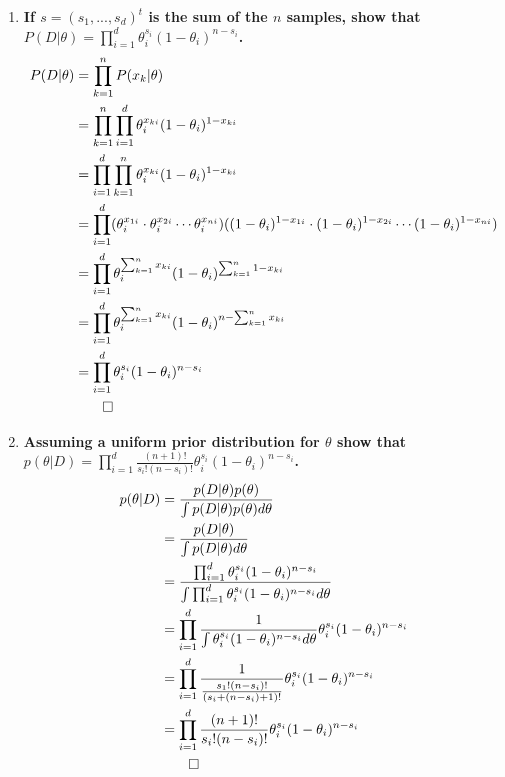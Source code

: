 \documentclass[12pt]{article}
\begin{document}
\begin{enumerate}
\begin{enumerate}
  \item \textbf{If $s=(s_1,...,s_d)^t$ is the sum of the $n$ samples, show that $P(D|\theta)=\prod_{i=1}^d\theta_i^{s_i}(1-\theta_i)^{n-s_i}$.}
    \begin{equation}
    \begin{split}
      P(D|\theta)& =\prod_{k=1}^nP(x_k|\theta) \\
      & = \prod_{k=1}^n\prod_{i=1}^d\theta_i^{x_{ki}}(1-\theta_i)^{1-x_{ki}} \\
      & = \prod_{i=1}^d\prod_{k=1}^n\theta_i^{x_{ki}}(1-\theta_i)^{1-x_{ki}} \\
      & = \prod_{i=1}^d(\theta_i^{x_{1i}}\cdot\theta_i^{x_{2i}}\cdots\theta_i^{x_{ni}})((1-\theta_i)^{1-x_{1i}}\cdot(1-\theta_i)^{1-x_{2i}}\cdots(1-\theta_i)^{1-x_{ni}}) \\
      & = \prod_{i=1}^d\theta_i^{\sum_{k=1}^nx_{ki}}(1-\theta_i)^{\sum_{k=1}^n1-x_{ki}} \\
      & = \prod_{i=1}^d\theta_i^{\sum_{k=1}^nx_{ki}}(1-\theta_i)^{n-\sum_{k=1}^nx_{ki}} \\
      & =\prod_{i=1}^d\theta_i^{s_i}(1-\theta_i)^{n-s_i} \\
      & \qed
    \end{split}
    \end{equation}
  \item \textbf{Assuming a uniform prior distribution for $\theta$ show that $p(\theta|D)=\prod_{i=1}^d\frac{(n+1)!}{s_i!(n-s_i)!}\theta_i^{s_i}(1-\theta_i)^{n-s_i}$.}
    \begin{equation}
    \begin{split}
      p(\theta|D)& = \frac{p(D|\theta)p(\theta)}{\int p(D|\theta)p(\theta)d\theta} \\
      & = \frac{p(D|\theta)}{\int p(D|\theta)d\theta} \\
      & = \frac{\prod_{i=1}^d\theta_i^{s_i}(1-\theta_i)^{n-s_i}}{\int \prod_{i=1}^d\theta_i^{s_i}(1-\theta_i)^{n-s_i}d\theta} \\
      & = \prod_{i=1}^d\frac{1}{\int \theta_i^{s_i}(1-\theta_i)^{n-s_i}d\theta}\theta_i^{s_i}(1-\theta_i)^{n-s_i} \\
      & = \prod_{i=1}^d\frac{1}{\frac{s_1!(n-s_i)!}{(s_i+(n-s_i)+1)!}}\theta_i^{s_i}(1-\theta_i)^{n-s_i} \\
      & = \prod_{i=1}^d\frac{(n+1)!}{s_i!(n-s_i)!}\theta_i^{s_i}(1-\theta_i)^{n-s_i} \\
      & \qed
    \end{split}
    \end{equation}

\end{enumerate}
\end{enumerate}
\end{document}
